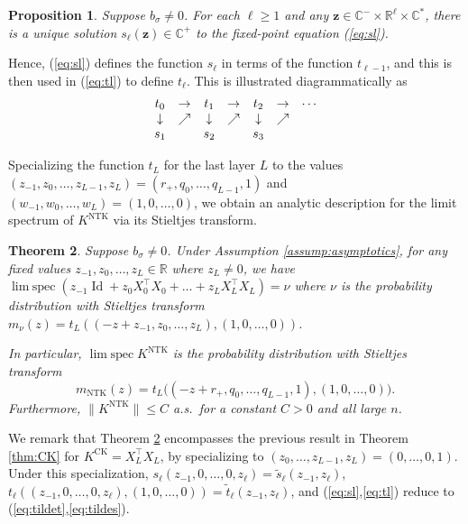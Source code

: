 \documentclass{article}
\newtheorem{theorem}{Theorem}[section]
\newtheorem{proposition}[theorem]{Proposition}
\theoremstyle{definition}
\newcommand{\R}{\mathbb{R}}
\newcommand{\C}{\mathbb{C}}
\newcommand{\Id}{\operatorname{Id}}
\newcommand{\CK}{\text{CK}}
\newcommand{\NTK}{\text{NTK}}
\newcommand{\prev}{{\text{prev}}}
\newcommand{\z}{\mathbf{z}}
\newcommand{\1}{\mathbf{1}}
\newcommand{\limspec}{\operatorname{lim\;spec}}
\begin{document}
\begin{proposition}\label{prop:swelldefined}
Suppose $b_\sigma\neq 0$. For each $\ell \geq 1$ and any $\z \in \C^- \times
\R^\ell \times \C^*$, there is a unique solution $s_\ell(\z) \in
\C^+$ to the fixed-point equation (\ref{eq:sl}).
\end{proposition}

Hence, (\ref{eq:sl}) defines the function $s_\ell$ in terms of the function
$t_{\ell-1}$, and this is then used in
(\ref{eq:tl}) to define $t_\ell$. This is illustrated diagrammatically as
\[\begin{matrix} 
t_0 & \rightarrow & t_1 & \rightarrow & t_2 &\rightarrow &\cdots\\
\downarrow& \large\nearrow & \downarrow& \large\nearrow & \downarrow& \large\nearrow & \\
s_1 &  & s_2 &  & s_3 & & \\
\end{matrix}\]



Specializing the function $t_L$ for the last layer $L$ to the values
$(z_{-1},z_0,\ldots,z_{L-1},z_L)=(r_+,q_0,\ldots,q_{L-1},1)$ and
$(w_{-1},w_0,\ldots,w_L)=(1,0,\ldots,0)$, we obtain an analytic description for
the limit spectrum of $K^\NTK$ via its Stieltjes transform.

\begin{theorem}\label{thm:NTK}
Suppose $b_\sigma\ne 0$. Under Assumption \ref{assump:asymptotics}, for any fixed values
$z_{-1},z_0,\ldots,z_L \in \R$ where $z_L \neq 0$, we have
$\limspec (z_{-1}\Id+z_0X_0^\top X_0+\ldots+z_L X_L^\top X_L)=\nu$
where $\nu$ is the probability distribution with Stieltjes transform
$m_\nu(z)=t_L((-z+z_{-1},z_0,\ldots,z_L),(1,0,\ldots,0))$.

In particular, $\limspec K^\NTK$ is the probability distribution with Stieltjes transform
\[m_\NTK(z)=t_L\Big((-z+r_+,q_0,\ldots,q_{L-1},1),(1,0,\ldots,0)\Big).\]
Furthermore, $\|K^\NTK\| \leq C$ a.s.\ for a constant $C>0$ and all large $n$.
\end{theorem}

We remark that Theorem \ref{thm:NTK} encompasses the previous result
in Theorem \ref{thm:CK} for $K^\CK=X_L^\top X_L$, by specializing to
$(z_0,\ldots,z_{L-1},z_L)=(0,\ldots,0,1)$. Under this specialization,
$s_\ell(z_{-1},0,\ldots,0,z_\ell)=\tilde{s}_\ell(z_{-1},z_\ell)$,
$t_\ell((z_{-1},0,\ldots,0,z_\ell),(1,0,\ldots,0))=\tilde{t}_\ell(z_{-1},z_\ell)$, and (\ref{eq:sl},\ref{eq:tl}) reduce to 
(\ref{eq:tildet},\ref{eq:tildes}).
\end{document}
